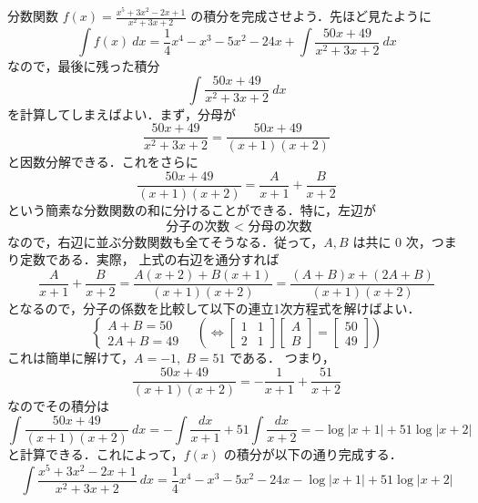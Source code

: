 \documentclass[10pt, uplatex, dvipdfmx]{jsarticle}
\theoremstyle{definition}
\numberwithin{equation}{section}
\newcommand{\ds}{\displaystyle}
\begin{document}
分数関数 $\ds f(x) = \frac{x^5+3x^2-2x+1}{x^2+3x+2}$ の積分を完成させよう．先ほど見たように
\[
  \int f(x) \ dx = \frac{1}{4}x^4-x^3-5x^2-24x + \int \frac{50x+49}{x^2+3x+2} \ dx
\]
なので，最後に残った積分
\[
  \int \frac{50x+49}{x^2+3x+2}\ dx
\]
を計算してしまえばよい．まず，分母が
\[
  \frac{50x+49}{x^2+3x+2} = \frac{50x+49}{(x+1)(x+2)}
\]
と因数分解できる．これをさらに
\[
  \frac{50x+49}{(x+1)(x+2)} = \frac{A}{x+1} + \frac{B}{x+2}
\]
という簡素な分数関数の和に分けることができる．特に，左辺が
\[
  \text{ 分子の次数 } < \text{ 分母の次数}
\]
なので，右辺に並ぶ分数関数も全てそうなる．従って，$A, B$ は共に $0$ 次，つまり定数である．実際，
上式の右辺を通分すれば
\[
  \frac{A}{x+1} + \frac{B}{x+2} = \frac{A(x+2)+B(x+1)}{(x+1)(x+2)} = \frac{(A+B)x + (2A+B)}{(x+1)(x+2)}
\]
となるので，分子の係数を比較して以下の連立1次方程式を解けばよい．
\[
  \begin{cases}
    A+B=50\\
    2A+B=49
  \end{cases} \quad \left( \Longleftrightarrow \left[
      \begin{array}{rr}
        1 & 1\\
        2 & 1
      \end{array}
      \right] \left[
        \begin{array}{r}
          A\\
          B
        \end{array}
      \right] = \left[
        \begin{array}{r}
          50\\
          49
        \end{array}
      \right] \right)
\]
これは簡単に解けて，$A=-1, \; B=51$ である． つまり，
\[
  \frac{50x+49}{(x+1)(x+2)} = -\frac{1}{x+1} + \frac{51}{x+2}
\]
なのでその積分は
\[
  \int \frac{50x+49}{(x+1)(x+2)} \ dx = -\int\frac{dx}{x+1} + 51\int
  \frac{dx}{x+2}= -\log|x+1| +51\log|x+2|
\]
と計算できる．これによって，$f(x)$ の積分が以下の通り完成する．
\[
  \int \frac{x^5+3x^2-2x+1}{x^2+3x+2} \ dx = \frac{1}{4}x^4 -
  x^3-5x^2-24x -\log|x+1| + 51 \log |x+2|
\]

\newpage
\end{document}
